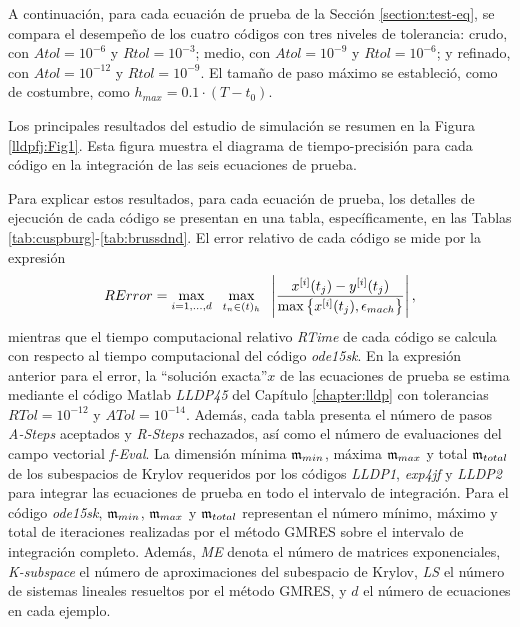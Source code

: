 A continuación, para cada ecuación de prueba de la Sección \ref{section:test-eq}, se compara el desempeño de los cuatro códigos con tres niveles de tolerancia: crudo, con $ Atol = 10^{-6}$ y $Rtol = 10^{-3}$; medio, con $Atol = 10^{-9}$ y $Rtol = 10^{-6}$; y refinado, con $ Atol = 10^{-12}$ y $Rtol = 10^{-9}$. El tamaño de paso máximo se estableció, como de costumbre, como $h_{max}=0\mathord{.}1\cdot(T-t_0)$.

Los principales resultados del estudio de simulación se resumen en la Figura \ref{lldpfj:Fig1}. Esta figura muestra el diagrama de tiempo-precisión para cada código en la integración de las seis ecuaciones de prueba.

Para explicar estos resultados, para cada ecuación de prueba, los detalles de ejecución de cada código se presentan en una tabla, específicamente, en las Tablas \ref{tab:cuspburg}-\ref{tab:brussdnd}. El error relativo de cada código se mide por la expresión
\begin{equation*}
	RError = \max_{i=1,\ldots,d} \;\ \max_{t_n\in(t)_h}  \;\ \left\lvert\frac{x^{[i]}(t_j)-y^{[i]}(t_j)}{\maxx{x^{[i]}(t_j),\epsilon_{mach}}}\right\rvert,
\end{equation*}
mientras que el tiempo computacional relativo \textit{RTime} de cada código se calcula con respecto al tiempo computacional del código \emph{ode15sk}. En la expresión anterior para el error, la \textquotedblleft solución exacta\textquotedblright \;$x$ de las ecuaciones de prueba se estima mediante el código Matlab \emph{LLDP45} del Capítulo \ref{chapter:lldp} con tolerancias $RTol=10^{-12}$ y $ATol=10^{-14}$. Además, cada tabla presenta el número de pasos \textit{A-Steps} aceptados y \textit{R-Steps} rechazados, así como el número de evaluaciones del campo vectorial \textit{f-Eval}. La dimensión mínima $\mathfrak{m}_ {min}$, máxima $\mathfrak{m}_ {max}$ y total $\mathfrak{m}_{total}$ de los subespacios de Krylov requeridos por los códigos \emph{LLDP1}, \emph{exp4jf} y \emph{LLDP2} para integrar las ecuaciones de prueba en todo el intervalo de integración. Para el código \emph{ode15sk}, $\mathfrak{m}_{min}$, $\mathfrak{m}_{max}$ y $\mathfrak{m}_{total}$ representan el número mínimo, máximo y total de iteraciones realizadas por el método GMRES sobre el intervalo de integración completo. Además, \textit{ME} denota el número de matrices exponenciales, \textit{K-subspace} el número de aproximaciones del subespacio de Krylov, \textit{LS} el número de sistemas lineales resueltos por el método GMRES, y $d$ el número de ecuaciones en cada ejemplo.

